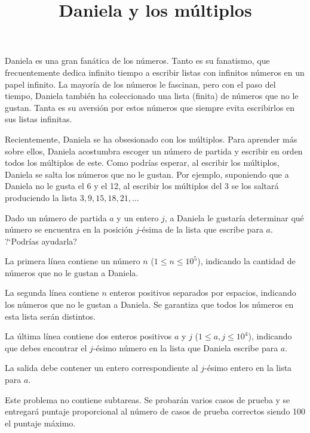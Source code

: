 \documentclass{oci}
\title{Daniela y los múltiplos}
\begin{document}
\begin{problemDescription}
Daniela es una gran fanática de los números.
Tanto es su fanatismo, que frecuentemente dedica infinito tiempo a
escribir listas con infinitos números en un papel infinito.
La mayoría de los números le fascinan, pero con el paso del tiempo,
Daniela también ha coleccionado una lista (finita) de números que no
le gustan.
Tanta es su aversión por estos números que siempre evita escribirlos en sus
listas infinitas.

Recientemente, Daniela se ha obsesionado con los múltiplos.
Para aprender más sobre ellos, Daniela acostumbra escoger un número de partida y
escribir en orden todos los múltiplos de este.
Como podrías esperar, al escribir los múltiplos, Daniela se salta los números que no le gustan.
Por ejemplo, suponiendo que a Daniela no le gusta el 6 y el 12, al escribir los múltiplos
del 3 se los saltará produciendo la lista $3, 9, 15, 18, 21, \ldots$

Dado un número de partida $a$ y un entero $j$, a Daniela le gustaría determinar
qué número se encuentra en la posición $j$-ésima de la lista que escribe para $a$.
?`Podrías ayudarla?
\end{problemDescription}

\begin{inputDescription}
La primera línea contiene un número $n$ ($1 \leq n \leq 10^5$), indicando la cantidad de números que no le gustan
a Daniela.

La segunda línea contiene $n$ enteros positivos separados por espacios,
indicando los números que no le gustan a Daniela.
Se garantiza que todos los números en esta lista serán distintos.

La última línea contiene dos enteros positivos $a$ y $j$ ($1 \leq a, j \leq 10^4$),
indicando que debes encontrar el $j$-ésimo número en la lista que Daniela
escribe para $a$.
\end{inputDescription}

\begin{outputDescription}
La salida debe contener un entero correspondiente al $j$-ésimo entero en la lista
para $a$.
\end{outputDescription}

\begin{scoreDescription}
Este problema no contiene subtareas.
Se probarán varios casos de prueba y se entregará puntaje proporcional al número
de casos de prueba correctos siendo 100 el puntaje máximo.
\end{scoreDescription}


\begin{sampleDescription}
\end{sampleDescription}
\end{document}
